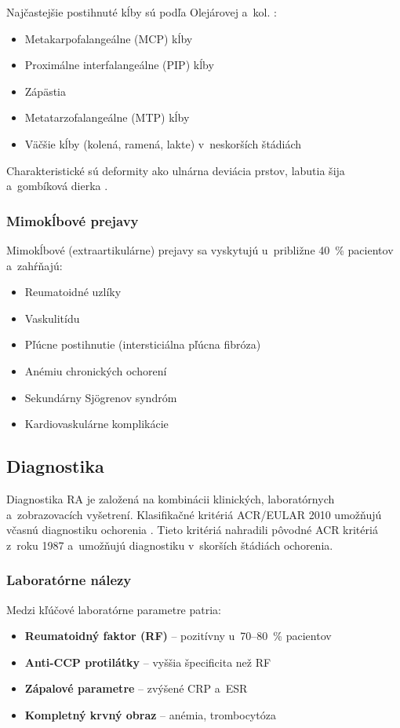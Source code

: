 Najčastejšie postihnuté kĺby sú podľa Olejárovej a~kol. \parencite*{Olejarova2016}:
\begin{itemize}
    \item Metakarpofalangeálne (MCP) kĺby
    \item Proximálne interfalangeálne (PIP) kĺby
    \item Zápästia
    \item Metatarzofalangeálne (MTP) kĺby
    \item Väčšie kĺby (kolená, ramená, lakte) v~neskorších štádiách
\end{itemize}

Charakteristické sú deformity ako ulnárna deviácia prstov, labutia šija a~gombíková dierka \parencite{pavelka2018}.

\subsubsection{Mimokĺbové prejavy}

Mimokĺbové (extraartikulárne) prejavy sa vyskytujú u~približne 40~\% pacientov a~zahŕňajú:
\begin{itemize}
    \item Reumatoidné uzlíky
    \item Vaskulitídu
    \item Pľúcne postihnutie (intersticiálna pľúcna fibróza)
    \item Anémiu chronických ochorení
    \item Sekundárny Sjögrenov syndróm
    \item Kardiovaskulárne komplikácie \parencite{Rovensky2015}
\end{itemize}

\subsection{Diagnostika}

Diagnostika RA je založená na kombinácii klinických, laboratórnych a~zobrazovacích vyšetrení. Klasifikačné kritériá ACR/EULAR 2010 umožňujú včasnú diagnostiku ochorenia \parencite{aletaha2010}. Tieto kritériá nahradili pôvodné ACR kritériá z~roku 1987 a~umožňujú diagnostiku v~skorších štádiách ochorenia.

\subsubsection{Laboratórne nálezy}

Medzi kľúčové laboratórne parametre patria:
\begin{itemize}
    \item \textbf{Reumatoidný faktor (RF)} -- pozitívny u~70--80~\% pacientov
    \item \textbf{Anti-CCP protilátky} -- vyššia špecificita než RF
    \item \textbf{Zápalové parametre} -- zvýšené CRP a~ESR
    \item \textbf{Kompletný krvný obraz} -- anémia, trombocytóza \parencite{Macejova2019}
\end{itemize}

